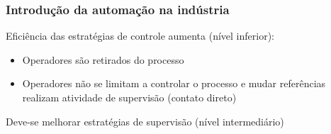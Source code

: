 \documentclass{beamer}
\begin{document}

\begin{frame}
    \frametitle{Introdução da automação na indústria}

    Eficiência das estratégias de controle aumenta (nível inferior):

\begin{itemize}
    \item Operadores são retirados do processo
    \item Operadores não se limitam a controlar o processo e mudar referências
          \implica realizam atividade de supervisão (contato direto)
\end{itemize}

    Deve-se melhorar estratégias de supervisão (nível intermediário)

\end{frame}
\end{document}
